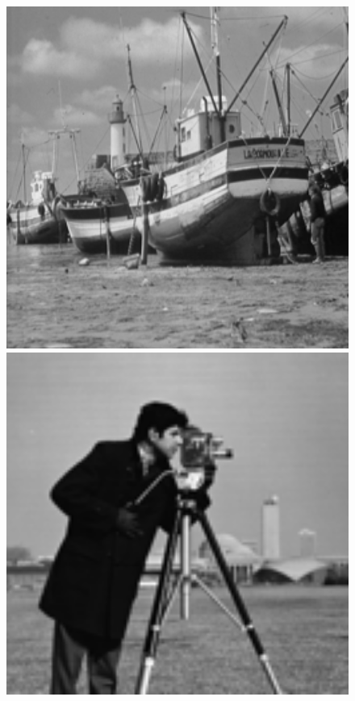 \documentclass[runningheads]{llncs}
\begin{document}
\begin{figure}[t]
{\begin{minipage}{0.09\textwidth}
\end{minipage}
\begin{minipage}{0.09\textwidth}
\includegraphics[width=1.06\textwidth]{boat.png}
\end{minipage}
\begin{minipage}{0.09\textwidth}
\includegraphics[width=1.06\textwidth]{cameraman.png}

\end{minipage}}
\end{figure}
\end{document}
